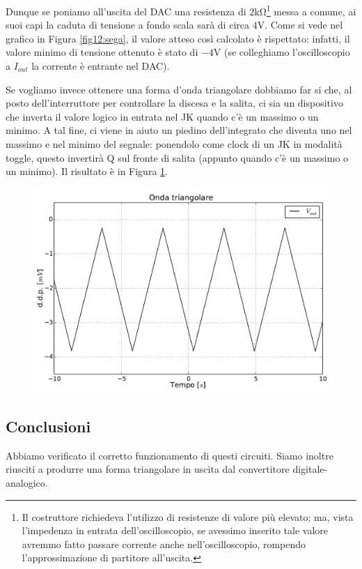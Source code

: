 Dunque se poniamo all'uscita del DAC una resistenza di $2 \si{\kilo\ohm}$\footnote{Il costruttore richiedeva l'utilizzo di resistenze di valore più elevato; ma, vista l'impedenza in entrata dell'oscilloscopio, se avessimo inserito tale valore avremmo fatto passare corrente anche nell'oscilloscopio, rompendo l'approssimazione di partitore all'uscita.} messa a comune, ai suoi capi la caduta di tensione a fondo scala sarà di circa $4 \si{\volt}$. Come si vede nel grafico in Figura \ref{fig12:sega}, il valore atteso così calcolato è rispettato: infatti, il valore minimo di tensione ottenuto è stato di $-4 \si{\volt}$ (se colleghiamo l'oscilloscopio a $I_{out}$ la corrente è entrante nel DAC).

Se vogliamo invece ottenere una forma d'onda triangolare dobbiamo far si che, al posto dell'interruttore per controllare la discesa e la salita, ci sia un dispositivo che inverta il valore logico in entrata nel JK quando c'è un massimo o un minimo. A tal fine, ci viene in aiuto un piedino dell'integrato che diventa uno nel massimo e nel minimo del segnale: ponendolo come clock di un JK in modalità toggle, questo invertirà Q sul fronte di salita (appunto quando c'è un massimo o un minimo). Il risultato è in Figura \ref{fig12:triangolare}.

\begin{figure}[htpc]
\centering
	\includegraphics[width=.65\textwidth]{../E12/latex/triangolare.pdf}
	\caption{}
	\label{fig12:triangolare}
\end{figure}

\subsection*{Conclusioni}

Abbiamo verificato il corretto funzionamento di questi circuiti. Siamo inoltre riusciti a produrre una forma triangolare in uscita dal convertitore digitale-analogico.
